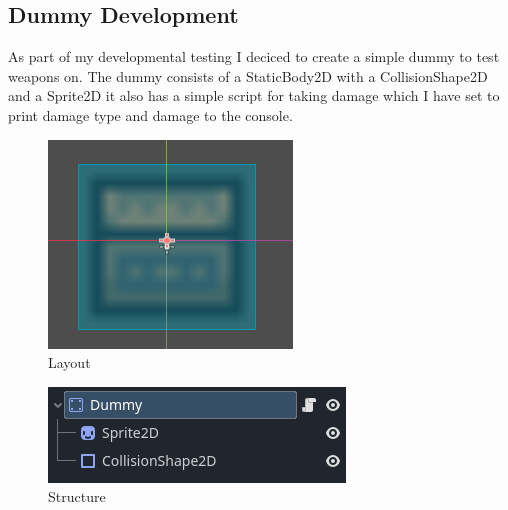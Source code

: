 \documentclass{article}
\begin{document}
        \subsection{Dummy Development}
        As part of my developmental testing I deciced to create a simple dummy to test weapons on. The dummy consists of a StaticBody2D with a CollisionShape2D and a Sprite2D it also has a simple script for taking damage which I have set to print damage type and damage to the console.\\
        \begin{multicols}{3}
                \begin{figure}[H]
                        \centering
                        \includegraphics[width = 0.9\columnwidth]{images/development/Dummy_layout.PNG}
                        \caption{Layout}
                \end{figure}
                \begin{figure}[H]
                        \centering
                        \includegraphics[width = 0.9\columnwidth]{images/development/Dummy_structure.PNG}
                        \caption{Structure}
                \end{figure}

\end{multicols}
\end{document}
